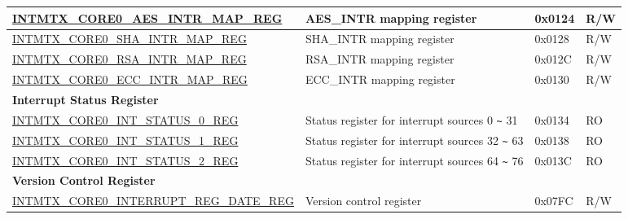 \begin{longtable}{ | p{10cm} | p{10cm} | p{1.3cm} | p{1cm} | }
\hyperref[regdesc:INTMTXCORE0AESINTRMAPREG]{INTMTX\_CORE0\_AES\_INTR\_MAP\_REG} & AES\_INTR mapping register & 0x0124 & R/W \\ \hline
\hyperref[regdesc:INTMTXCORE0SHAINTRMAPREG]{INTMTX\_CORE0\_SHA\_INTR\_MAP\_REG} & SHA\_INTR mapping register & 0x0128 & R/W \\ \hline
\hyperref[regdesc:INTMTXCORE0RSAINTRMAPREG]{INTMTX\_CORE0\_RSA\_INTR\_MAP\_REG} & RSA\_INTR mapping register & 0x012C & R/W \\ \hline
\hyperref[regdesc:INTMTXCORE0ECCINTRMAPREG]{INTMTX\_CORE0\_ECC\_INTR\_MAP\_REG} & ECC\_INTR mapping register & 0x0130 & R/W \\ \hline
\multicolumn{4}{|l|}{\textbf{Interrupt Status Register}} \\ \hline
\hyperref[regdesc:INTMTXCORE0INTSTATUS0REG]{INTMTX\_CORE0\_INT\_STATUS\_0\_REG} & Status register for interrupt sources 0 \verb+~+ 31 & 0x0134 & RO \\ \hline
\hyperref[regdesc:INTMTXCORE0INTSTATUS1REG]{INTMTX\_CORE0\_INT\_STATUS\_1\_REG} & Status register for interrupt sources 32 \verb+~+ 63& 0x0138 & RO \\ \hline
\hyperref[regdesc:INTMTXCORE0INTSTATUS2REG]{INTMTX\_CORE0\_INT\_STATUS\_2\_REG} & Status register for interrupt sources 64 \verb+~+ 76 & 0x013C & RO \\ \hline
\multicolumn{4}{|l|}{\textbf{Version Control Register}} \\ \hline
\hyperref[regdesc:INTMTXCORE0INTERRUPTREGDATEREG]{INTMTX\_CORE0\_INTERRUPT\_REG\_DATE\_REG} & Version control register & 0x07FC & R/W \\ \hline
\end{longtable}
